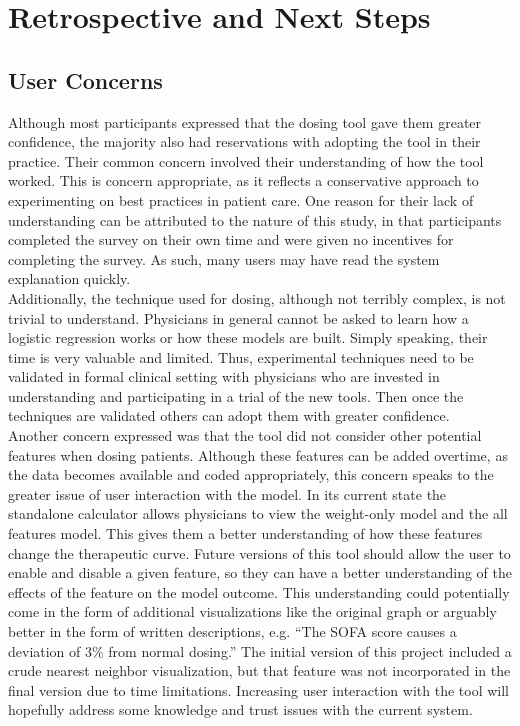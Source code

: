 \documentclass[12pt,a4paper,]{report}
\begin{document}
\chapter{Retrospective and Next
Steps}\label{retrospective-and-next-steps}

\section{User Concerns}\label{user-concerns}

Although most participants expressed that the dosing tool gave them
greater confidence, the majority also had reservations with adopting the
tool in their practice. Their common concern involved their
understanding of how the tool worked. This is concern appropriate, as it
reflects a conservative approach to experimenting on best practices in
patient care. One reason for their lack of understanding can be
attributed to the nature of this study, in that participants completed
the survey on their own time and were given no incentives for completing
the survey. As such, many users may have read the system explanation
quickly.\\
Additionally, the technique used for dosing, although not terribly
complex, is not trivial to understand. Physicians in general cannot be
asked to learn how a logistic regression works or how these models are
built. Simply speaking, their time is very valuable and limited. Thus,
experimental techniques need to be validated in formal clinical setting
with physicians who are invested in understanding and participating in a
trial of the new tools. Then once the techniques are validated others
can adopt them with greater confidence.\\
Another concern expressed was that the tool did not consider other
potential features when dosing patients. Although these features can be
added overtime, as the data becomes available and coded appropriately,
this concern speaks to the greater issue of user interaction with the
model. In its current state the standalone calculator allows physicians
to view the weight-only model and the all features model. This gives
them a better understanding of how these features change the therapeutic
curve. Future versions of this tool should allow the user to enable and
disable a given feature, so they can have a better understanding of the
effects of the feature on the model outcome. This understanding could
potentially come in the form of additional visualizations like the
original graph or arguably better in the form of written descriptions,
e.g. ``The SOFA score causes a deviation of 3\% from normal dosing.''
The initial version of this project included a crude nearest neighbor
visualization, but that feature was not incorporated in the final
version due to time limitations. Increasing user interaction with the
tool will hopefully address some knowledge and trust issues with the
current system.
\end{document}
